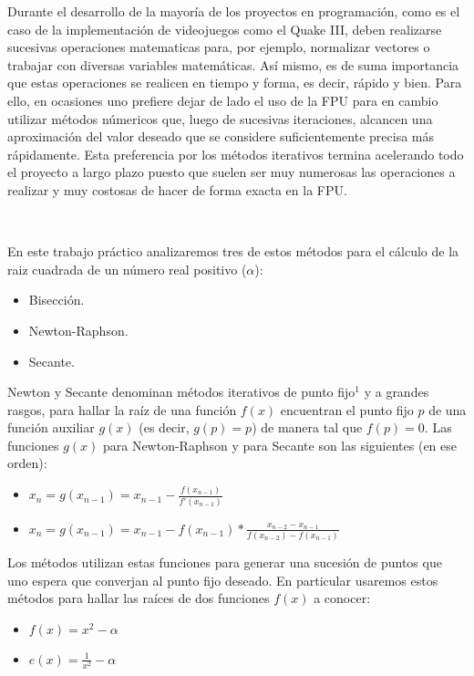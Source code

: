 Durante el desarrollo de la mayoría de los proyectos en programación, como es el caso de la implementación de videojuegos como el Quake III, deben realizarse sucesivas operaciones matematicas para, por ejemplo, normalizar vectores o trabajar con diversas variables matemáticas. Así mismo, es de 
suma importancia que estas operaciones se realicen en tiempo y forma, es decir, rápido y bien. Para ello, en ocasiones uno prefiere dejar de lado el uso de la FPU para en cambio utilizar métodos númericos que, luego de sucesivas iteraciones, alcancen una aproximación del valor deseado que se considere suficientemente precisa más rápidamente. Esta preferencia por los métodos iterativos termina acelerando todo el proyecto a largo plazo puesto que suelen ser muy numerosas las operaciones a realizar y muy costosas de hacer de forma exacta en la FPU.

~

En este trabajo práctico analizaremos tres de estos métodos para el cálculo de la raiz cuadrada de un número real positivo ($\alpha$): 
\begin{itemize}
	\item Bisección.
	\item Newton-Raphson.
	\item Secante.
\end{itemize}

Newton y Secante denominan métodos iterativos de punto fijo$^1$ y a grandes rasgos, para hallar la raíz de una función $f(x)$ encuentran el punto fijo $p$ de una función auxiliar $g(x)$ (es decir, $g(p) = p$) de manera tal que $f(p) = 0$. Las funciones $g(x)$ para Newton-Raphson y para Secante son las siguientes (en ese orden):
\begin{itemize}
	\item $\displaystyle x_n = g(x_{n-1}) = x_{n-1} - \frac{f(x_{n-1})}{f'(x_{n-1})}$
	\item $\displaystyle x_n = g(x_{n-1}) = x_{n-1} - f(x_{n-1})*\frac{x_{n-2} - x_{n-1}}{f(x_{n-2}) - f(x_{n-1})}$
\end{itemize}

Los métodos utilizan estas funciones para generar una sucesión de puntos que uno espera que converjan al punto fijo deseado. 
En particular usaremos estos métodos para hallar las raíces de dos funciones $f(x)$ a conocer:

\begin{itemize}
	\item $f(x) = x^2 - \alpha$
	\item $\displaystyle e(x) = \frac{1}{x^2} - \alpha$
\end{itemize}

